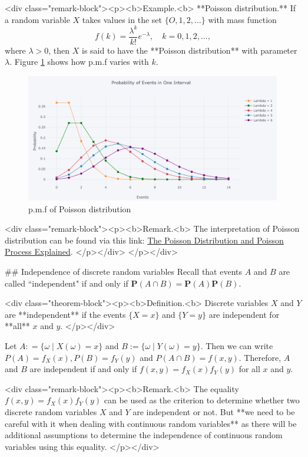 <div class="remark-block"><p><b>Example.<b> 
**Poisson distribution.** If a random variable $X$ takes values in the set $\{O, 1, 2, \dots \}$ with mass function
$$\begin{equation}
    f(k) = \frac{\lambda^k}{k!} e^{-\lambda}, \quad k = 0, 1, 2, \dots, 
\end{equation}$$
where $\lambda > 0$, then $X$ is said to have the **Poisson distribution** with parameter $\lambda$. Figure \ref{fig:poisson} shows how p.m.f varies with $k$.
\begin{figure}[!htb]
    \centering
    \includegraphics[scale=0.18]{plots/poisson.png}
    \caption{p.m.f of Poisson distribution}
    \label{fig:poisson}
\end{figure}

<div class="remark-block"><p><b>Remark.<b> 
The interpretation of Poisson distribution can be found via this link: \href{https://towardsdatascience.com/the-poisson-distribution-and-poisson-process-explained-4e2cb17d459}{The Poisson Distribution and Poisson Process Explained}.
</p></div>
</p></div>


## Independence of discrete random variables
Recall that events $A$ and $B$ are called ``independent" if and only if $\mathbf{P}(A \cap B) = \mathbf{P}(A)\mathbf{P}(B)$. 

<div class="theorem-block"><p><b>Definition.<b> 
Discrete variables $X$ and $Y$ are **independent** if the events $\{X = x\}$ and $\{Y = y\}$ are independent for **all** $x$ and $y$. 
</p></div>

Let $A: = \{ \omega \;\vert\; X(\omega) = x \}$ and $B:= \{ \omega \;\vert\; Y(\omega) = y \}$. Then we can write $P(A) = f_X(x), P(B) = f_Y(y)$ and $P(A \cap B) = f(x, y)$. Therefore, $A$ and $B$ are independent if and only if $f(x,y) = f_X(x) f_Y(y)$ for all $x$ and $y$.

<div class="remark-block"><p><b>Remark.<b> 
The equality $f(x,y) = f_X(x) f_Y(y)$ can be used as the criterion to determine whether two discrete random variables $X$ and $Y$ are independent or not. But **we need to be careful with it when dealing with continuous random variables** as there will be additional assumptions to determine the independence of continuous random variables using this equality.
</p></div>

